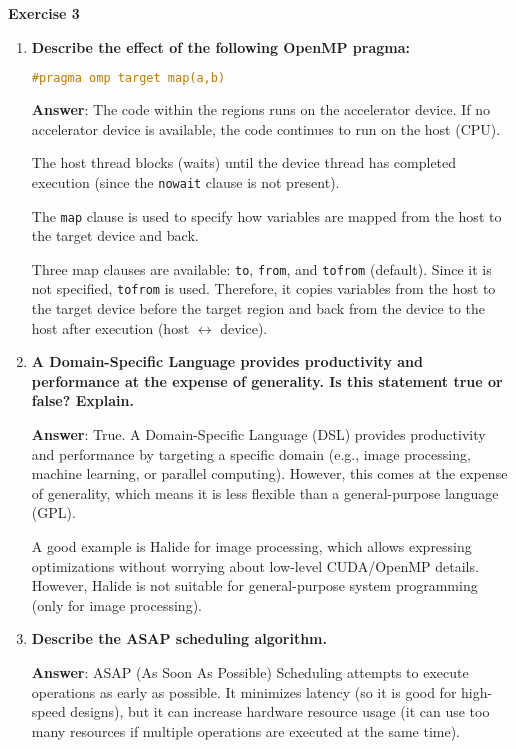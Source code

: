 \begin{flushleft}
    \textcolor{Green3}{ \textbf{Exercise 3}}
\end{flushleft}
\begin{enumerate}[label=\Alph*.]
    \item \textcolor{Green3}{\textbf{%
        Describe the effect of the following OpenMP pragma:
    }}
    \begin{lstlisting}[language=c++]
#pragma omp target map(a,b)\end{lstlisting}

    \textbf{Answer}: The code within the regions runs on the accelerator device. If no accelerator device is available, the code continues to run on the host (CPU).

    The host thread blocks (waits) until the device thread has completed execution (since the \texttt{nowait} clause is not present).

    The \texttt{map} clause is used to specify how variables are mapped from the host to the target device and back.

    Three map clauses are available: \texttt{to}, \texttt{from}, and \texttt{tofrom} (default). Since it is not specified, \texttt{tofrom} is used. Therefore, it copies variables from the host to the target device before the target region and back from the device to the host after execution (host $\leftrightarrow$ device).

    \item \textcolor{Green3}{\textbf{%
        A Domain-Specific Language provides productivity and performance at the expense of generality. Is this statement true or false? Explain.
    }}

    \textbf{Answer}: True. A Domain-Specific Language (DSL) provides productivity and performance by targeting a specific domain (e.g., image processing, machine learning, or parallel computing). However, this comes at the expense of generality, which means it is less flexible than a general-purpose language (GPL).

    A good example is Halide for image processing, which allows expressing optimizations without worrying about low-level CUDA/OpenMP details. However, Halide is not suitable for general-purpose system programming (only for image processing).

    \item \textcolor{Green3}{\textbf{%
        Describe the ASAP scheduling algorithm.
    }}

    \textbf{Answer}: ASAP (As Soon As Possible) Scheduling attempts to execute operations as early as possible. It minimizes latency (so it is good for high-speed designs), but it can increase hardware resource usage (it can use too many resources if multiple operations are executed at the same time).
\end{enumerate}